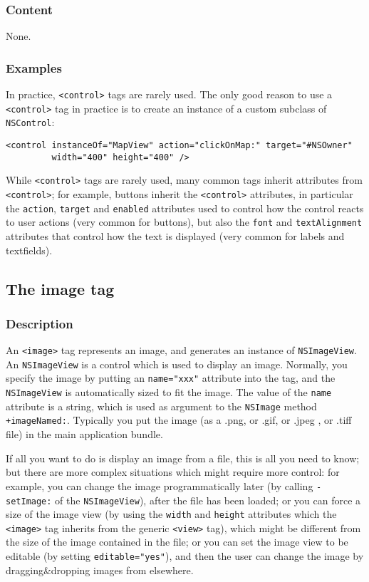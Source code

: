 \subsubsection{Content}
None.

\subsubsection{Examples}
In practice, \texttt{<control>} tags are rarely used.  The only good
reason to use a \texttt{<control>} tag in practice is to create an
instance of a custom subclass of \texttt{NSControl}:
\begin{verbatim}
<control instanceOf="MapView" action="clickOnMap:" target="#NSOwner" 
         width="400" height="400" />
\end{verbatim}

While \texttt{<control>} tags are rarely used, many common tags
inherit attributes from \texttt{<control>}; for example, buttons
inherit the \texttt{<control>} attributes, in particular the
\texttt{action}, \texttt{target} and \texttt{enabled} attributes used
to control how the control reacts to user actions (very common for
buttons), but also the \texttt{font} and \texttt{textAlignment}
attributes that control how the text is displayed (very common for
labels and textfields).

\subsection{The image tag}

\subsubsection{Description}
An \texttt{<image>} tag represents an image, and generates an instance
of \texttt{NSImageView}.  An \texttt{NSImageView} is a control which
is used to display an image.  Normally, you specify the image by
putting an \texttt{name="xxx"} attribute into the tag, and the
\texttt{NSImageView} is automatically sized to fit the image.
The value of the \texttt{name} attribute is a string, which is used as
argument to the \texttt{NSImage} method \texttt{+imageNamed:}.
Typically you put the image (as a .png, or .gif, or .jpeg , or .tiff
file) in the main application bundle.

If all you want to do is display an image from a file, this is all you
need to know; but there are more complex situations which might
require more control: for example, you can change the image
programmatically later (by calling \texttt{-setImage:} of the
\texttt{NSImageView}), after the file has been loaded; or you can
force a size of the image view (by using the \texttt{width} and
\texttt{height} attributes which the \texttt{<image>} tag inherits 
from the generic \texttt{<view>} tag), which might be different from
the size of the image contained in the file; or you can set the image
view to be editable (by setting \texttt{editable="yes"}), and then the
user can change the image by dragging\&dropping images from elsewhere.

